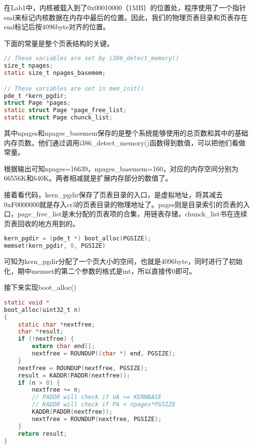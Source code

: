 \documentclass[11pt,a4paper]{article}
\begin{document}
在Lab1中，内核被载入到了0x00010000（1MB）的位置处，程序使用了一个指针end来标记内核数据在内存中最后的位置。因此，我们的物理页表目录和页表存在end标记后按4096byte对齐的位置。

下面的常量是整个页表结构的关键。

\setmainfont{Consolas}
\begin{lstlisting}[language={C},firstnumber=13,title=kern/pmap.c] 
// These variables are set by i386_detect_memory()
size_t npages;		
static size_t npages_basemem;

// These variables are set in mem_init()
pde_t *kern_pgdir;	
struct Page *pages;	
static struct Page *page_free_list;
static struct Page chunck_list;
\end{lstlisting}
\setmainfont[BoldFont=黑体]{宋体}
  
其中npages和npages\_basemem保存的是整个系统能够使用的总页数和其中的基础内存页数。他们通过调用i386\_detect\_memory()函数得到数值，可以把他们看做常量。

根据输出可知npages=16639，npages\_basemem=160，对应的内存空间分别为66556K和640K。两者相减就是扩展内存部分的数值了。

接着看代码，kern\_pgdir保存了页表目录的入口，是虚拟地址，将其减去0xF0000000就是存入cr3的页表目录的物理地址了。pages则是目录索引的页表的入口，page\_free\_list是未分配的页表项的合集，用链表存储，chunck\_list书在连续页表回收的地方用到的。

\setmainfont{Consolas}
\begin{lstlisting}[language={C},firstnumber=142,title=kern/pmap.c] 
kern_pgdir = (pde_t *) boot_alloc(PGSIZE);
memset(kern_pgdir, 0, PGSIZE)
\end{lstlisting}
\setmainfont[BoldFont=黑体]{宋体}

可知为kern\_pgdir分配了一个页大小的空间，也就是4096byte，同时进行了初始化，期中memset的第二个参数的格式是int，所以直接传0即可。

接下来实现boot\_alloc()
\setmainfont{Consolas}
\begin{lstlisting}[language={C},firstnumber=84,title=kern/pmap.c] 
static void *
boot_alloc(uint32_t n)
{
	static char *nextfree;
	char *result;
	if (!nextfree) {
		extern char end[];
		nextfree = ROUNDUP((char *) end, PGSIZE);
	}
	nextfree = ROUNDUP(nextfree, PGSIZE);
	result = KADDR(PADDR(nextfree));
	if (n > 0) {
		nextfree += n;
		// PADDR will check if VA >= KERNBASE 
		// KADDR will check if PA < npages*PGSIZE
		KADDR(PADDR(nextfree));
		nextfree = ROUNDUP(nextfree, PGSIZE);
	}
	return result;
}
\end{lstlisting}
\setmainfont[BoldFont=黑体]{宋体}
\end{document}
